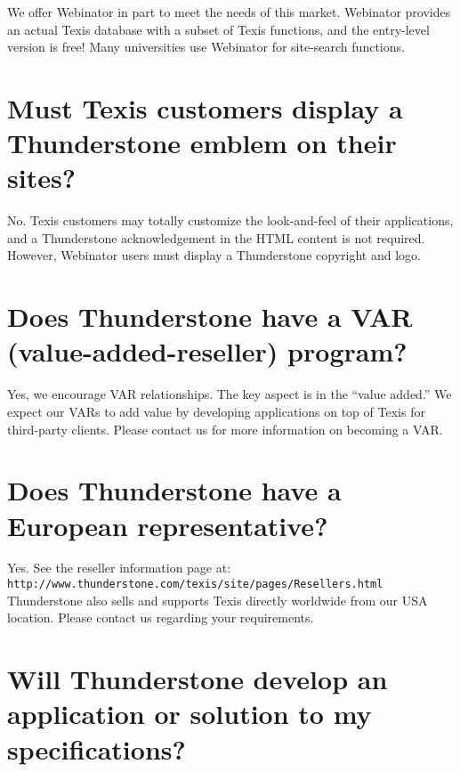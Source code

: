 We offer Webinator in part to meet the needs of this market. Webinator
provides an actual Texis database with a subset of Texis functions,
and the entry-level version is free!  Many universities use Webinator
for site-search functions.

\section{Must Texis customers display a Thunderstone emblem on their sites? }

No.  Texis customers may totally customize the look-and-feel of their
applications, and a Thunderstone acknowledgement in the HTML content
is not required.  However, Webinator users must display a Thunderstone
copyright and logo.

\section{Does Thunderstone have a VAR (value-added-reseller) program? }

Yes, we encourage VAR relationships.  The key aspect is in the ``value
added.''  We expect our VARs to add value by developing applications
on top of Texis for third-party clients.  Please contact us for more
information on becoming a VAR.


\section{Does Thunderstone have a European representative?}

Yes. See the reseller information page at: {\tt
  http://www.thunderstone.com/texis/site/pages/Resellers.html}
Thunderstone also sells and supports Texis directly worldwide from our
USA location.  Please contact us regarding your requirements.

\section{Will Thunderstone develop an application or solution to my specifications? }

